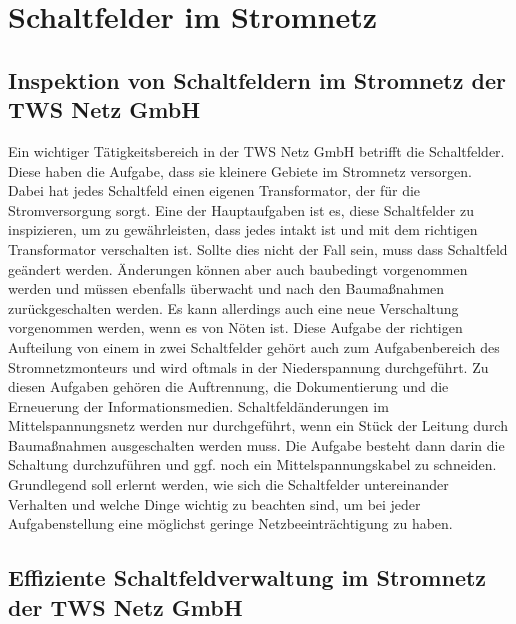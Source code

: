 \iffalse

\chapter{Schaltfelder im Stromnetz}
\label{cha:Schaltfelder}

\section{Inspektion von Schaltfeldern im Stromnetz der TWS Netz GmbH}

Ein wichtiger Tätigkeitsbereich in der TWS Netz GmbH betrifft die Schaltfelder. Diese haben die Aufgabe, dass sie kleinere Gebiete im Stromnetz versorgen. 
Dabei hat jedes Schaltfeld einen eigenen Transformator, der für die Stromversorgung sorgt. Eine der Hauptaufgaben ist es, diese Schaltfelder zu inspizieren, 
um zu gewährleisten, dass jedes intakt ist und mit dem richtigen Transformator verschalten ist. Sollte dies nicht der Fall sein, muss dass Schaltfeld geändert 
werden. Änderungen können aber auch baubedingt vorgenommen werden und müssen ebenfalls überwacht und nach den Baumaßnahmen zurückgeschalten werden. Es kann 
allerdings auch eine neue Verschaltung vorgenommen werden, wenn es von Nöten ist. Diese Aufgabe der richtigen Aufteilung von einem in zwei Schaltfelder 
gehört auch zum Aufgabenbereich des Stromnetzmonteurs und wird oftmals in der Niederspannung durchgeführt. Zu diesen Aufgaben gehören \zB die Auftrennung, 
die Dokumentierung und die Erneuerung der Informationsmedien. Schaltfeldänderungen im Mittelspannungsnetz werden nur durchgeführt, wenn ein Stück der 
Leitung durch Baumaßnahmen ausgeschalten werden muss. Die Aufgabe besteht dann darin die Schaltung durchzuführen und ggf. noch ein Mittelspannungskabel zu 
schneiden. Grundlegend soll erlernt werden, wie sich die Schaltfelder untereinander Verhalten und welche Dinge wichtig zu beachten sind, um bei jeder 
Aufgabenstellung eine möglichst geringe Netzbeeinträchtigung zu haben. 

\section{Effiziente Schaltfeldverwaltung im Stromnetz der TWS Netz GmbH}

